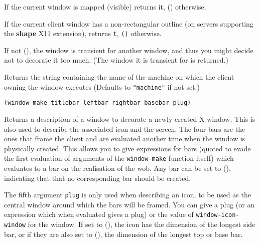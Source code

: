 If the current window is mapped (visible) returns it, () otherwise.

        

If the current client window has a non-rectangular outline (on servers
supporting the {\bf shape} X11 extension), returns \verb"t", \verb"()"
otherwise.

        

If not (), the window is transient for another window, and thus you might
decide not to decorate it too much. (The window it is transient for is
returned.)

        

Returns the string containing the name of the machine on which the client
owning the window executes (Defaults to \verb|"machine"| if not set.)

        
{\usagefont\begin{verbatim}
(window-make titlebar leftbar rightbar basebar plug)
\end{verbatim}}\usageupspace

\centerline{}

Returns a description of a {\GWM} window to decorate a newly created X
window. This is also used to describe the associated icon and the screen.
The four bars are the ones that frame the client and are evaluated
another time when the window is physically created. This allows you to give
expressions for bars (quoted to evade the first evaluation of arguments of
the \verb"window-make" function itself) which evaluates to a bar on the
realisation of the wob.  Any bar can be set to (), indicating that that no
corresponding bar should be created.

The fifth argument \verb"plug" is only used when describing an icon, 
to be used as the central window
around which the bars will be framed. You can give a plug (or an expression
which when evaluated gives a plug) or the value of
\verb"window-icon-window" for the window. 
If set to (), the icon has
the dimension of the longest side bar, or if they are also set to (), the
dimension of the longest top or base bar.

